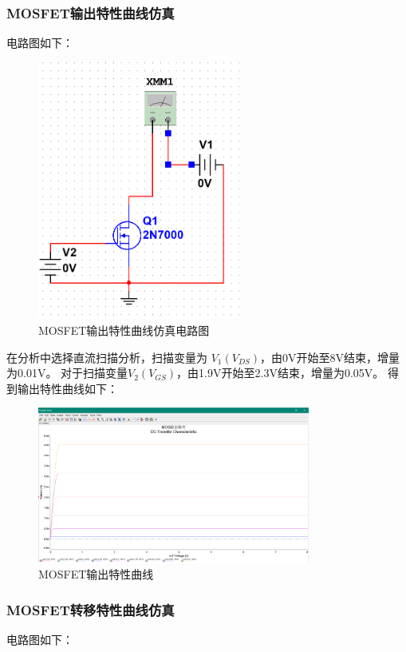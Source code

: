 \documentclass[a4paper,11pt,UTF8]{article}
\numberwithin{equation}{subsection}
\begin{document}
\subsubsection{MOSFET输出特性曲线仿真}
电路图如下：

\begin{figure}[H]
	\centering
	\includegraphics[width=0.6\textwidth]{2.13.png}	
	\caption{MOSFET输出特性曲线仿真电路图}
\end{figure}

在分析中选择直流扫描分析，扫描变量为 $V_1(V_{DS})$，由0$\text{V}$开始至8$\text{V}$结束，增量为0.01$\text{V}$。
对于扫描变量$V_2(V_{GS})$，由1.9$\text{V}$开始至2.3$\text{V}$结束，增量为0.05$\text{V}$。
得到输出特性曲线如下：

\begin{figure}
	\centering
	\includegraphics[width=0.8\textwidth]{2.14.png}
	\caption{MOSFET输出特性曲线}
\end{figure}

\subsubsection{MOSFET转移特性曲线仿真}
电路图如下：
\end{document}
